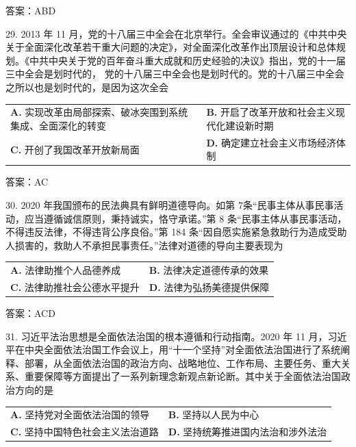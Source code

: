 \documentclass[UTF8,11pt]{ctexart}
\begin{document}
答案：ABD


29. 2013 年 11 月，党的十八届三中全会在北京举行。全会审议通过的《中共中央关于全面深化改革若干重大问题的决定》，对全面深化改革作出顶层设计和总体规划。《中共中央关于党的百年奋斗重大成就和历史经验的决议》指出，党的十一届三中全会是划时代的， 党的十八届三中全会也是划时代的。党的十八届三中全会之所以也是划时代的，是因为这次全会


\begin{center}\begin{tabular}{>{\raggedright\arraybackslash}p{\dimexpr(\linewidth-4\tabcolsep)/2\relax}>{\raggedright\arraybackslash}p{\dimexpr(\linewidth-4\tabcolsep)/2\relax}}
\textbf{A.} 实现改革由局部探索、破冰突围到系统集成、全面深化的转变 & \textbf{B.} 开启了改革开放和社会主义现代化建设新时期\\[.35em]
\textbf{C.} 开创了我国改革开放新局面 & \textbf{D.} 确定建立社会主义市场经济体制\\[.35em]\end{tabular}\end{center}

答案：AC


30. 2020 年我国颁布的民法典具有鲜明道德导向。如第 7条“民事主体从事民事活动，应当遵循诚信原则，秉持诚实，恪守承诺。”第 8 条“民事主体从事民事活动，不得违反法律，不得违背公序良俗。”第 184 条“因自愿实施紧急救助行为造成受助人损害的，救助人不承担民事责任。”法律对道德的导向主要表现为


\begin{center}\begin{tabular}{>{\raggedright\arraybackslash}p{\dimexpr(\linewidth-4\tabcolsep)/2\relax}>{\raggedright\arraybackslash}p{\dimexpr(\linewidth-4\tabcolsep)/2\relax}}
\textbf{A.} 法律助推个人品德养成 & \textbf{B.} 法律决定道德传承的效果\\[.35em]
\textbf{C.} 法律助推社会公德水平提升 & \textbf{D.} 法律为弘扬美德提供保障\\[.35em]\end{tabular}\end{center}

答案：ACD


31. 习近平法治思想是全面依法治国的根本遵循和行动指南。2020 年 11 月，习近平在中央全面依法治国工作会议上，用“十一个坚持”对全面依法治国进行了系统阐释、部署，从全面依法治国的政治方向、战略地位、工作布局、主要任务、重大关系、重要保障等方面提出了一系列新理念新观点新论断。其中关于全面依法治国政治方向的是


\begin{center}\begin{tabular}{>{\raggedright\arraybackslash}p{\dimexpr(\linewidth-4\tabcolsep)/2\relax}>{\raggedright\arraybackslash}p{\dimexpr(\linewidth-4\tabcolsep)/2\relax}}
\textbf{A.} 坚持党对全面依法治国的领导 & \textbf{B.} 坚持以人民为中心\\[.35em]
\textbf{C.} 坚持中国特色社会主义法治道路 & \textbf{D.} 坚持统筹推进国内法治和涉外法治\\[.35em]\end{tabular}\end{center}
\end{document}
